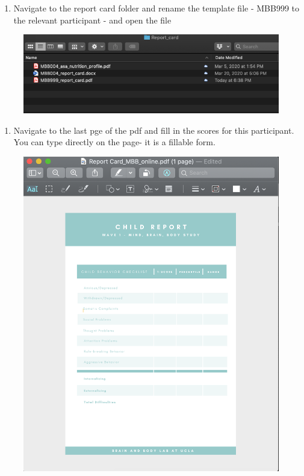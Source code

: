 \documentclass[]{book}
\providecommand{\tightlist}{%
  \setlength{\itemsep}{0pt}\setlength{\parskip}{0pt}}
\begin{document}
\begin{enumerate}
\def\labelenumi{\arabic{enumi}.}
\setcounter{enumi}{1}
\tightlist
\item
  Navigate to the report card folder and rename the template file - MBB999 to the relevant participant - and open the file
\end{enumerate}

\begin{figure}
\centering
\includegraphics{images/report_card_online/2.png}
\caption{}
\end{figure}

\begin{enumerate}
\def\labelenumi{\arabic{enumi}.}
\setcounter{enumi}{2}
\tightlist
\item
  Navigate to the last pge of the pdf and fill in the scores for this participant. You can type directly on the page- it is a fillable form.
\end{enumerate}

\begin{figure}
\centering
\includegraphics{images/report_card_online/3.png}
\caption{}
\end{figure}
\end{document}
